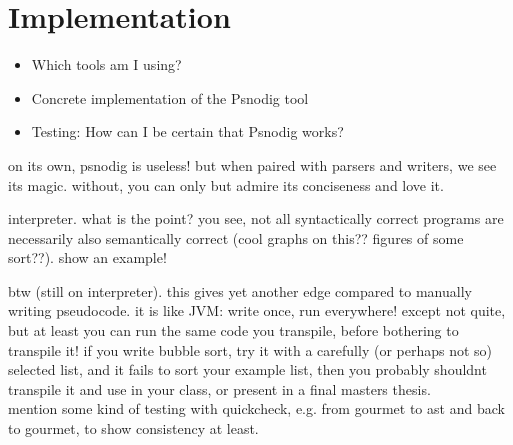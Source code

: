 \chapter{Implementation}
\begin{itemize}
    \item Which tools am I using?
    \item Concrete implementation of the Psnodig tool
    \item Testing: How can I be certain that Psnodig works?
\end{itemize}

on its own, psnodig is useless! but when paired with parsers and writers, we see its magic. without, you can only but admire its conciseness and love it.

interpreter. what is the point? you see, not all syntactically correct programs are necessarily also semantically correct (cool graphs on this?? figures of some sort??). show an example!

btw (still on interpreter). this gives yet another edge compared to manually writing pseudocode. it is like JVM: write once, run everywhere! except not quite, but at least you can run the same code you transpile, before bothering to transpile it! if you write bubble sort, try it with a carefully (or perhaps not so) selected list, and it fails to sort your example list, then you probably shouldnt transpile it and use in your class, or present in a final masters thesis. \hfill \\

mention some kind of testing with quickcheck, e.g. from gourmet to ast and back to gourmet, to show consistency at least.